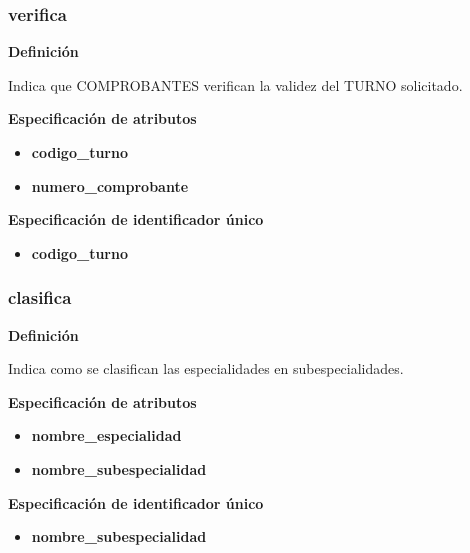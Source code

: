 \documentclass[a4paper,11pt]{article}
\begin{document}
\subsubsection{\textbf{verifica}}

\textbf{Definición}

Indica que COMPROBANTES verifican la validez del TURNO solicitado.

\textbf{Especificación de atributos}


\begin{itemize}

     \item \textbf{codigo\_turno}

     \item \textbf{numero\_comprobante} 


\end{itemize}

\textbf{Especificación de identificador único}

\begin{itemize}

     \item \textbf{codigo\_turno}


\end{itemize}


\subsubsection{\textbf{clasifica}}

\textbf{Definición}

Indica como se clasifican las especialidades en subespecialidades.

\textbf{Especificación de atributos}


\begin{itemize}

     \item \textbf{nombre\_especialidad}

     \item \textbf{nombre\_subespecialidad}


\end{itemize}

\textbf{Especificación de identificador único}

\begin{itemize}

     \item \textbf{nombre\_subespecialidad}


\end{itemize}
\end{document}
